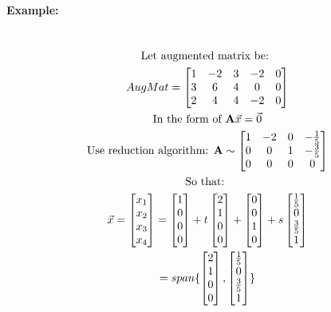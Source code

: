 \documentclass{article}
\begin{document}
	\paragraph{Example:}
	\begin{multline}
		\\
		\text{Let augmented matrix be: }\\
		AugMat = \begin{bmatrix}
			1 & -2 & 3 & -2 & 0 \\
			3 & 6 & 4 & 0 & 0 \\
			2 & 4 & 4 & -2 & 0 \\
		\end{bmatrix} \\
		\text{In the form of } \text{\textbf{A}} \vec{x} = \vec{0} \\
		\text{Use reduction algorithm: } \text{\textbf{A}} \sim 
		\begin{bmatrix}
			1 & -2 & 0 & - \frac{1}{5} \\
			0 & 0 & 1 & - \frac{3}{5} \\
			0 & 0 & 0 & 0 \\
		\end{bmatrix} \\
		\text{So that: } \\
		\vec{x} = \begin{bmatrix}x_1\\x_2\\x_3\\x_4\\\end{bmatrix} = \begin{bmatrix}1\\0\\0\\0\\\end{bmatrix} + t \begin{bmatrix}2\\1\\0\\0\end{bmatrix} + \begin{bmatrix}0\\0\\1\\0\end{bmatrix} + s \begin{bmatrix}\frac{1}{5}\\0\\\frac{3}{5}\\1\\\end{bmatrix} \\ = span\{\begin{bmatrix}2\\1\\0\\0\end{bmatrix},\begin{bmatrix}\frac{1}{5}\\0\\\frac{3}{5}\\1\\\end{bmatrix}\}
		\\
	\end{multline}
\end{document}
